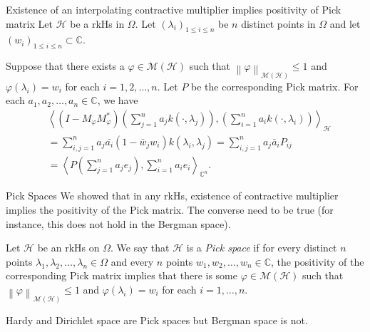 \documentclass{beamer}
\newcommand{\C}{\mathbb C}
\newcommand{\calH}{{\mathcal H}}
\newcommand{\calM}{{\mathcal M}}
\newcommand{\ip}[1]{\left\langle #1 \right\rangle}
\newcommand{\norm}[1]{\left\lVert #1 \right\rVert}
\begin{document}
\begin{frame}{Existence of an interpolating contractive multiplier implies positivity of Pick matrix}
Let $\calH$ be a rkHs in $\Omega$. Let $\left( \lambda_{i} \right)_{1\le i \le n}$ be $n$ distinct points in $\Omega$ and let $\left( w_{i} \right)_{1 \le i \le n} \subset \C$.

Suppose that there exists a $\varphi \in \calM \left( \calH \right)$ such that $\norm{\varphi}_{\calM \left( \calH \right)} \le 1$ and $\varphi \left( \lambda_{i} \right) = w_{i}$ for each $i=1,2, \ldots , n$. Let $P$ be the corresponding Pick matrix. \pause For each $a_{1}, a_{2}, \ldots , a_{n} \in \C$, we have
\begin{align*}
& \ip{\left( I-M_{\varphi} M_{\varphi} ^{*} \right) \left( \sum_{j=1}^{n} a_{j} k\left( \cdot , \lambda_{j} \right) \right),  \left( \sum_{i=1}^{n} a_{i} k\left( \cdot , \lambda_{i} \right) \right)}_{\calH} \\ &= \sum_{i,j=1}^{n} a_{j}\bar{a_{i}} \left( 1-\bar w_{j} w_{i} \right) k\left( \lambda_{i}, \lambda_{j} \right) = \sum_{i,j=1}^{n} a_{j} \bar a_{i} P_{ij} \\ &= \ip{P\left( \sum_{j=1}^{n} a_{j} e_{j} \right) , \sum_{i=1}^{n} a_{i} e_{i}}_{\C ^{n}}.
\end{align*}
\end{frame}

\begin{frame}{Pick Spaces}
We showed that in any rkHs, existence of contractive multiplier implies the positivity of the Pick matrix. The converse need to be true (for instance, this does not hold in the Bergman space).
\pause
\begin{definition}
Let $\calH$ be an rkHs on $\Omega$. We say that $\calH$ is a \textit{Pick space} if for every distinct $n$ points $\lambda_{1}, \lambda_{2}, \ldots , \lambda_{n} \in \Omega$ and every $n$ points $w_{1}, w_{2}, \ldots , w_{n} \in \C$, the positivity of the corresponding Pick matrix implies that there is some $\varphi \in \calM \left( \calH \right)$ such that $\norm{\varphi}_{\calM \left( \calH \right)} \le 1$ and $\varphi \left( \lambda_{i} \right) = w_{i}$ for each $i=1, \ldots , n$.
\label{def:Pick space}
\end{definition}
\pause
\begin{example}
Hardy and Dirichlet space are Pick spaces but Bergman space is not.
\end{example}
\end{frame}
\end{document}
